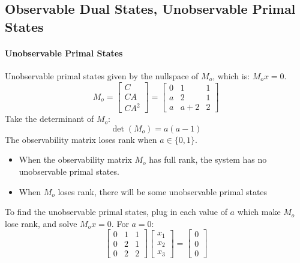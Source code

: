 \subsection{Observable Dual States, Unobservable Primal States}
\paragraph{Unobservable Primal States} Unobservable primal states given by the nullspace of $M_{o}$, which is: $M_{o}x=0$.
\begin{equation*}
  M_{o}=
  \begin{bmatrix}
    C \\
    CA \\
    CA^{2}
  \end{bmatrix}=
  \begin{bmatrix}
    0 & 1 & 1 \\
    a & 2 & 1 \\
    a & a+2 & 2
  \end{bmatrix}
\end{equation*}
Take the determinant of $M_{o}$:
\begin{equation*}
  \det(M_{o})=a(a-1)
\end{equation*}
The observability matrix loses rank when $a\in\{0,1\}$.
\begin{itemize}
  \item{When the observability matrix $M_{o}$ has full rank, the system has no unobservable primal states.}
  \item{When $M_{o}$ loses rank, there will be some unobservable primal states}
\end{itemize}
To find the unobservable primal states, plug in each value of $a$ which make $M_{o}$ lose rank, and solve $M_{o}x=0$.
For $a=0$:
\begin{equation*}
  \begin{bmatrix}
    0 & 1 & 1 \\
    0 & 2 & 1 \\
    0 & 2 & 2
  \end{bmatrix}
  \begin{bmatrix}
    x_{1} \\
    x_{2} \\
    x_{3}
  \end{bmatrix}=
  \begin{bmatrix}
    0 \\
    0 \\
    0
  \end{bmatrix}
\end{equation*}
